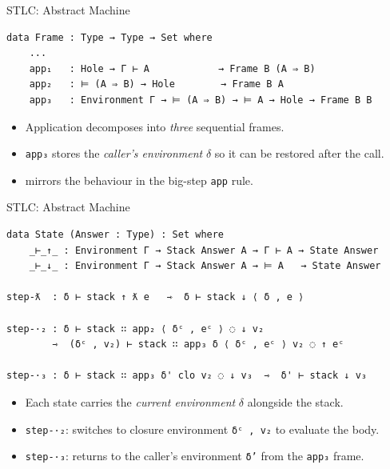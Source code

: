 \documentclass[10pt,compress,aspectratio=169]{beamer}
\begin{document}
\begin{frame}[fragile]{STLC: Abstract Machine}
\begin{verbatim}
data Frame : Type → Type → Set where
    ...
    app₁   : Hole → Γ ⊢ A            → Frame B (A ⇒ B)
    app₂   : ⊨ (A ⇒ B) → Hole        → Frame B A      
    app₃   : Environment Γ → ⊨ (A ⇒ B) → ⊨ A → Hole → Frame B B
\end{verbatim}
\begin{itemize}
    \item Application decomposes into \emph{three} sequential frames.
    \item \texttt{app₃} stores the \emph{caller's environment} $\delta$ so it can be restored after the call.
    \item mirrors the behaviour in the big-step \texttt{app} rule.
\end{itemize}
\end{frame}

\begin{frame}[fragile]{STLC: Abstract Machine}
\begin{verbatim}
data State (Answer : Type) : Set where
    _⊢_↑_ : Environment Γ → Stack Answer A → Γ ⊢ A → State Answer
    _⊢_↓_ : Environment Γ → Stack Answer A → ⊨ A   → State Answer

step-ƛ  : δ ⊢ stack ↑ ƛ e   ⇾  δ ⊢ stack ↓ ⟨ δ , e ⟩

step-·₂ : δ ⊢ stack ∷ app₂ ⟨ δᶜ , eᶜ ⟩ ◌ ↓ v₂
        ⇾  (δᶜ , v₂) ⊢ stack ∷ app₃ δ ⟨ δᶜ , eᶜ ⟩ v₂ ◌ ↑ eᶜ

step-·₃ : δ ⊢ stack ∷ app₃ δ' clo v₂ ◌ ↓ v₃  ⇾  δ' ⊢ stack ↓ v₃
\end{verbatim}
\begin{itemize}
    \item Each state carries the \emph{current environment} $\delta$ alongside the stack.
    \item \texttt{step-·₂}: switches to closure environment \texttt{δᶜ , v₂} to evaluate the body.
    \item \texttt{step-·₃}: returns to the caller's environment \texttt{δ'} from the \texttt{app₃} frame.
\end{itemize}
\end{frame}

\end{document}
